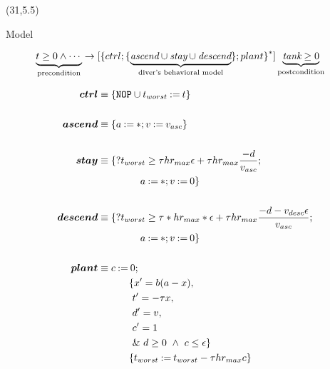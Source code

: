 \documentclass[final]{beamer}
\theoremstyle{definition}
\begin{document}
\begin{frame}[fragile]
\begin{textblock}{51}(31,5.5)

\begin{block}{Model}
\begin{multicols}{2}
\begin{align*}
\underbrace{t \ge 0 \land \dotsm \vphantom{\dibox{}}}_{\text{precondition}} & 
\limply 
\dibox{\prepeat{ \{ ctrl;
\{ \underbrace{\textit{ascend} \cup \textit{stay} \cup \textit{descend}}_{\text{diver's behavioral model}} \}; plant 
\}
}}\underbrace{\textit{tank} \ge 0}_{\text{postcondition}}
\label{eq:carmodel}
\end{align*}

\begin{align*}
\bm{ctrl} &\equiv \{\texttt{NOP} \cup t_{worst}\hspace{-0.05em}\mathrel{{:}{=}}\hspace{-0.07em}t\} \\\\
\bm{ascend} &\equiv \{a\hspace{-0.05em}\mathrel{{:}{=}}\hspace{-0.07em}*;v\hspace{-0.05em}\mathrel{{:}{=}}\hspace{-0.07em}v_{asc} \} \\\\
\bm{stay} &\equiv \{?t_{worst} \ge \tau hr_{max} \epsilon
        + \tau hr_{max}  \frac{-d}{v_{asc}};\\
        &\hspace{1.5cm}a\hspace{-0.05em}\mathrel{{:}{=}}\hspace{-0.07em}*;v\hspace{-0.05em}\mathrel{{:}{=}}\hspace{-0.07em}0\} \\\\
\bm{descend} &\equiv \{?t_{worst} \ge \tau*hr_{max} * \epsilon
        + \tau hr_{max}  \frac{-d - v_{desc}\epsilon}{v_{asc}};\\
        &\hspace{1.5cm}a\hspace{-0.05em}\mathrel{{:}{=}}\hspace{-0.07em}*; v\hspace{-0.05em}\mathrel{{:}{=}}\hspace{-0.07em}0\} \\\\
\bm{plant} &\equiv  c\hspace{-0.05em}\mathrel{{:}{=}}\hspace{-0.07em}0; \\
          &\hspace{1.1cm}\{x' = b(a-x),\\
          &\ \hspace{1.1cm}t' = -\tau x,\\
          &\ \hspace{1.1cm}d' = v,\\
          &\ \hspace{1.1cm}c' = 1 \\
          &\ \hspace{1.1cm}\text{\& } d \ge 0 ~\land~c \le \epsilon\} \\
          &\hspace{1.1cm}\{t_{worst}\hspace{-0.05em}\mathrel{{:}{=}}\hspace{-0.07em}t_{worst} - \tau hr_{max} c\} 
\end{align*}


\end{multicols}
\end{block}
\end{textblock}
\end{frame}
\end{document}
